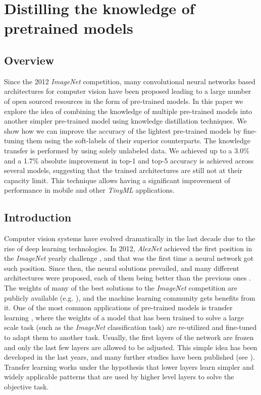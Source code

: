\chapter{Distilling the knowledge of pretrained models} \label{ch:distillation}
\section{Overview}
Since the 2012 \textit{ImageNet} competition, many convolutional neural networks based architectures for computer vision have been proposed leading to a large number of open sourced resources in the form of pre-trained models. In this paper we explore the idea of combining the knowledge of multiple pre-trained models into another simpler pre-trained model using knowledge distillation techniques. We show how we can improve the accuracy of the lightest pre-trained models by fine-tuning them using the soft-labels of their superior counterparts. The knowledge transfer is performed by using solely unlabeled data. We achieved up to a 3.0\% and a 1.7\% absolute improvement in top-1 and top-5 accuracy is achieved across several models, suggesting that the trained architectures are still not at their capacity limit. This technique allows having a significant improvement of performance in mobile and other \textit{TinyML} applications.


\section{Introduction}
Computer vision systems have evolved dramatically in the last decade due to the rise of deep learning technologies. In 2012, \textit{AlexNet} \cite{krizhevsky2012} achieved the first position in the \textit{ImageNet} yearly challenge \cite{ILSVRC15}, and that was the first time a neural network got such position. Since then, the neural solutions prevailed, and many different architectures were proposed, each of them being better than the previous ones \cite{khan2020, algan2021}. The weights of many of the best solutions to the \textit{ImageNet} competition are publicly available (e.g. \cite{he2016, chollet2017, szegedy2016, szegedy2017, howard2017, pham2018, tan2019}), and the machine learning community gets benefits from it. One of the most common applications of pre-trained models is transfer learning \cite{huang2021}, where the weights of a model that has been trained to solve a large scale task (such as the \textit{ImageNet} classification task) are re-utilized and fine-tuned to adapt them to another task. Usually, the first layers of the network are frozen and only the last few layers are allowed to be adjusted. This simple idea has been developed in the last years, and many further studies have been published (see \cite{zhu2018, wu2021, pzhao2021}). Transfer learning works under the hypothesis that lower layers learn simpler and widely applicable patterns that are used by higher level layers to solve the objective task.


